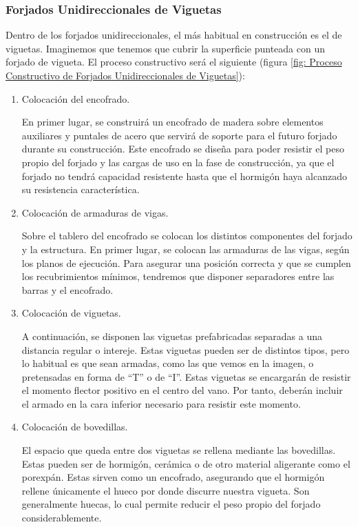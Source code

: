 \subsubsection*{Forjados Unidireccionales de Viguetas}

Dentro de los forjados unidireccionales, el más habitual en construcción es el de viguetas. Imaginemos que tenemos que cubrir la superficie punteada con un forjado de vigueta. El proceso constructivo será el siguiente (figura \ref{fig: Proceso Constructivo de Forjados Unidireccionales de Viguetas}):

\begin{enumerate}
    \item Colocación del encofrado.
    
En primer lugar, se construirá un encofrado de madera sobre elementos auxiliares y puntales de acero que servirá de soporte para el futuro forjado durante su construcción. Este encofrado se diseña para poder resistir el peso propio del forjado y las cargas de uso en la fase de construcción, ya que el forjado no tendrá capacidad resistente hasta que el hormigón haya alcanzado su resistencia característica.

    \item Colocación de armaduras de vigas.
    
Sobre el tablero del encofrado se colocan los distintos componentes del forjado y la estructura. En primer lugar, se colocan las armaduras de las vigas, según los planos de ejecución. Para asegurar una posición correcta y que se cumplen los recubrimientos mínimos, tendremos que disponer separadores entre las barras y el encofrado.

    \item Colocación de viguetas.

A continuación, se disponen las viguetas prefabricadas separadas a una distancia regular o intereje. Estas viguetas pueden ser de distintos tipos, pero lo habitual es que sean armadas, como las que vemos en la imagen, o pretensadas en forma de ``T'' o de ``I''. Estas viguetas se encargarán de resistir el momento flector positivo en el centro del vano. Por tanto, deberán incluir el armado en la cara inferior necesario para resistir este momento.

    \item Colocación de bovedillas.
    
El espacio que queda entre dos viguetas se rellena mediante las bovedillas. Estas pueden ser de hormigón, cerámica o de otro material aligerante como el porexpán. Estas sirven como un encofrado, asegurando que el hormigón rellene únicamente el hueco por donde discurre nuestra vigueta. Son generalmente huecas, lo cual permite reducir el peso propio del forjado considerablemente.


\end{enumerate}
